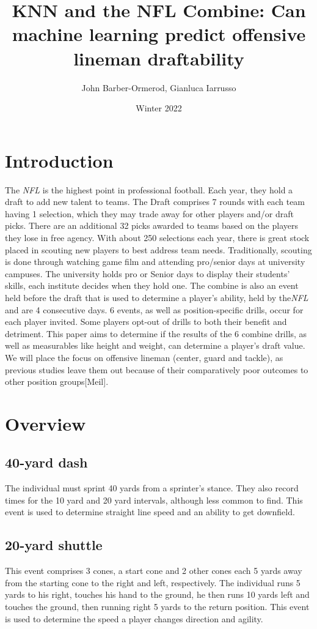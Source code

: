 \documentclass[confrence]{IEEEtran}
\title{KNN and the NFL Combine\texttrademark: Can machine learning predict offensive lineman draftability}
\author{John Barber-Ormerod, Gianluca Iarrusso}
\date{Winter 2022}
\begin{document}
\maketitle
\section*{Introduction}
The \textit{NFL} is the highest point in professional football. Each year, they hold a draft to add new talent to teams.
The Draft comprises 7 rounds with each team having 1 selection,
which they may trade away for other players and/or draft picks.
There are an additional 32 picks awarded to teams based on the players they lose in free agency.
With about 250 selections each year, there is great stock placed in scouting new players to best address team needs.
Traditionally, scouting is done through watching game film and attending pro/senior days at university campuses.
The university holds pro or Senior days to display their students' skills, each institute decides when they hold one.
The combine is also an event held before the draft that is used to determine a player's ability, held by the\textit{NFL} and are 4 consecutive days.
6 events, as well as position-specific drills, occur for each player invited.
Some players opt-out of drills to both their benefit and detriment.
This paper aims to determine if the results of the 6 combine drills, as well as measurables like height and weight, can determine a player's draft value.
We will place the focus on offensive lineman (center, guard and tackle), as previous studies leave them out because of their comparatively poor outcomes to other position groups[Meil].
\section*{Overview}
\subsection*{40-yard dash}
The individual must sprint 40 yards from a sprinter's stance. They also record times for the 10 yard and 20 yard intervals, although less common to find.
This event is used to determine straight line speed and an ability to get downfield.
\subsection*{20-yard shuttle}
This event comprises 3 cones, a start cone and 2 other cones each 5 yards away from the starting cone to the right and left, respectively.
The individual runs 5 yards to his right, touches his hand to the ground, he then runs 10 yards left and touches the ground, then running right 5 yards to the return position.
This event is used to determine the speed a player changes direction and agility.
\end{document}
